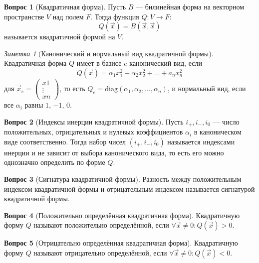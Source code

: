 \documentclass[a4paper,11pt]{article}
\theoremstyle{remark}
\newtheorem*{note}{Заметка}
\theoremstyle{definition}
\newtheorem{question}{Вопрос}
\begin{document}
\begin{question}[Квадратичная форма]
Пусть \(B\) --- билинейная форма на векторном пространстве \(V\) над полем \(F\). Тогда функция \(Q: V \rightarrow F\):
\begin{equation*}
	Q(\vec{x}) = B(\vec{x}, \vec{x})
\end{equation*}
называется квадратичной формой на \(V\).
\end{question}


\begin{note}[Канонический и нормальный вид квадратичной формы]
Квадратичная форма \(Q\) имеет в базисе \(e\) канонический вид, если
\begin{equation*}
	Q(\vec{x}) = \alpha_1x_1^2 + \alpha_2x_2^2 + \dots + a_nx_n^2
\end{equation*}
для \(\vec{x}_e = \begin{pmatrix}x1 \\ \vdots \\ xn \end{pmatrix}\), то есть \(Q_e = \mathrm{diag}(\alpha_1, \alpha_2, \dots, \alpha_n)\), и нормальный вид, если все \(\alpha_i\) равны \(1\), \(-1\), \(0\).
\end{note}


\begin{question}[Индексы инерции квадратичной формы]
Пусть \(i_+, i_-, i_0\) --- число положительных, отрицательных и нулевых коэффициентов \(\alpha{}_i\) в каноническом виде соответственно. Тогда набор чисел \((i_+, i_-, i_0)\) называется индексами инерции и не зависит от выбора канонического вида, то есть его можно однозначно определить по форме \(Q\). 
\end{question}


\begin{question}[Сигнатура квадратичной формы]
Разность между положительным индексом квадратичной формы и отрицательным индексом называется сигнатурой квадратичной формы.
\end{question}


\begin{question}[Положительно определённая квадратичная форма]
Квадратичную форму \(Q\) называют положительно определённой, если \(\forall \vec{x} \neq 0: Q(\vec{x}) > 0\).
\end{question}


\begin{question}[Отрицательно определённая квадратичная форма]
Квадратичную форму \(Q\) называют отрицательно определённой, если \(\forall \vec{x} \neq 0: Q(\vec{x}) < 0\).
\end{question}
\end{document}
